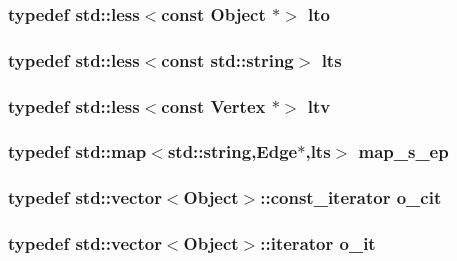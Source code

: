 \subsubsection{\setlength{\rightskip}{0pt plus 5cm}typedef std::less$<$const {\bf Object} $\ast$$>$ {\bf lto}}\label{meshmorph_8h_8330b10e338fa046ad1547a1e5a2f9c0}


\subsubsection{\setlength{\rightskip}{0pt plus 5cm}typedef std::less$<$const std::string$>$ {\bf lts}}\label{meshmorph_8h_502b03f11852c3daa44121be7f33ba67}


\subsubsection{\setlength{\rightskip}{0pt plus 5cm}typedef std::less$<$const {\bf Vertex} $\ast$$>$ {\bf ltv}}\label{meshmorph_8h_21e1832a86b3c598ae7cc21040547a49}


\subsubsection{\setlength{\rightskip}{0pt plus 5cm}typedef std::map$<$std::string,{\bf Edge}$\ast$,{\bf lts}$>$ {\bf map\_\-s\_\-ep}}\label{meshmorph_8h_44f8ecd3bb7785b1b65f8fe86ece7e8f}


\subsubsection{\setlength{\rightskip}{0pt plus 5cm}typedef std::vector$<${\bf Object}$>$::const\_\-iterator {\bf o\_\-cit}}\label{meshmorph_8h_bc066bbbef7a11c4ee8fa91ec325d609}


\subsubsection{\setlength{\rightskip}{0pt plus 5cm}typedef std::vector$<${\bf Object}$>$::iterator {\bf o\_\-it}}\label{meshmorph_8h_ee98e25193e5b352ac2eefbd05ccde6a}


